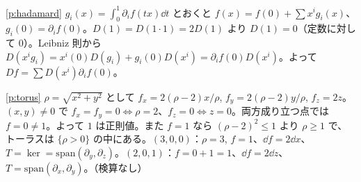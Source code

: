 \begin{sol}{\ref{p:hadamard}}
$g_i(x)=\int_0^1\partial_if(tx)\dd t$ とおくと $f(x)=f(0)+\sum x^ig_i(x)$、$g_i(0)=\partial_if(0)$。$D(1)=D(1\cdot1)=2D(1)$ より $D(1)=0$（定数に対して $0$）。Leibniz 則から $D(x^ig_i)=x^i(0)D(g_i)+g_i(0)D(x^i)=\partial_if(0)D(x^i)$。よって $Df=\sum D(x^i)\partial_if(0)$。
\end{sol}
\begin{sol}{\ref{p:torus}}
$\rho=\sqrt{x^2+y^2}$ として $f_x=2(\rho-2)x/\rho$, $f_y=2(\rho-2)y/\rho$, $f_z=2z$。$(x,y)\ne0$ で $f_x=f_y=0\Leftrightarrow\rho=2$、$f_z=0\Leftrightarrow z=0$。両方成り立つ点では $f=0\ne1$。よって $1$ は正則値。また $f=1$ なら $(\rho-2)^2\le1$ より $\rho\ge1$ で、トーラスは $\{\rho>0\}$ の中にある。$(3,0,0)$：$\rho=3$, $f=1$、$\dd f=2\dd x$、$T=\ker=\mathrm{span}(\partial_y,\partial_z)$。$(2,0,1)$：$f=0+1=1$、$\dd f=2\dd z$、$T=\mathrm{span}(\partial_x,\partial_y)$。（検算なし）
\end{sol}

